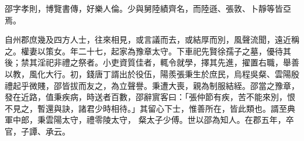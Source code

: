 \begin{pinyinscope}
 
 
 邵字孝則，博覽書傳，好樂人倫。少與舅陸績齊名，而陸遜、張敦、卜靜等皆亞焉。
 
 
 自州郡庶幾及四方人士，往來相見，或言議而去，或結厚而別，風聲流聞，遠近稱之。權妻以策女。年二十七，起家為豫章太守。下車祀先賢徐孺子之墓，優待其後；禁其淫祀非禮之祭者。小吏資質佳者，輒令就學，擇其先進，擢置右職，舉善以教，風化大行。初，錢唐丁諝出於役伍，陽羨張秉生於庶民，烏程吳粲、雲陽殷禮起乎微賤，邵皆拔而友之，為立聲譽。秉遭大喪，親為制服結絰。邵當之豫章，發在近路，值秉疾病，時送者百數，邵辭賔客曰：「張仲節有疾，苦不能來別，恨不見之，暫還與訣，諸君少時相待。」其留心下士，惟善所在，皆此類也。諝至典軍中郎，秉雲陽太守，禮零陵太守，
 粲太子少傅。世以邵為知人。在郡五年，卒官，子譚、承云。
 
 
\end{pinyinscope}